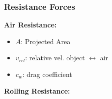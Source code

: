     \subsubsection{Resistance Forces}
        \begin{minipage}{0.7\linewidth}
            \vspace{2pt}
            \textbf{Air Resistance:}
            \begin{itemize}[label=-]
                \item $A$: Projected Area
                \item $v_{rel}$: relative vel. object $\leftrightarrow$ air
                \item  $c_w$: drag coefficient
            \end{itemize}
            \vskip3pt
            \textbf{Rolling Resistance:}
        \end{minipage}
        \begin{minipage}{0.29\linewidth}
            \begin{center}
            \end{center}
        \end{minipage}
        \vspace{-0.5em}
